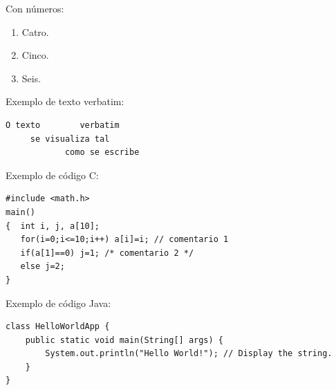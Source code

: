 Con números:

\begin{enumerate}
\item Catro.
\item Cinco.
\item Seis.
\end{enumerate}

Exemplo de texto verbatim:

\begin{verbatim}
O texto        verbatim 
     se visualiza tal
            como se escribe
\end{verbatim}

Exemplo de código C:

\lstset{language=C}

\begin{lstlisting}
#include <math.h>
main()
{  int i, j, a[10];
   for(i=0;i<=10;i++) a[i]=i; // comentario 1
   if(a[1]==0) j=1; /* comentario 2 */
   else j=2;
}
\end{lstlisting}

Exemplo de código Java:

\lstset{language=java}

\begin{lstlisting}
class HelloWorldApp {
    public static void main(String[] args) {
        System.out.println("Hello World!"); // Display the string.
    }
}
\end{lstlisting}


